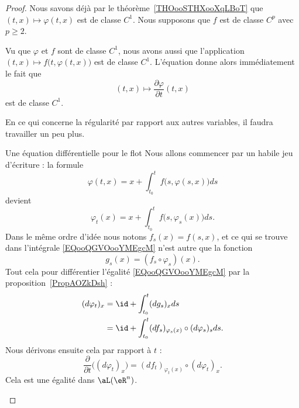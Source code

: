 \begin{proof}
    Nous savons déjà par le théorème~\ref{THOooSTHXooXqLBoT} que \( (t,x)\mapsto \varphi(t,x)\) est de classe \( C^1\). Nous supposons que \( f\) est de classe \( C^p\) avec \( p\geq 2\).

    Vu que \( \varphi\) et \( f\) sont de classe \( C^1\), nous avons aussi que l'application \( (t,x)\mapsto f\big( t,\varphi(t,x) \big)\) est de classe \( C^1\). L'équation donne alors immédiatement le fait que
    \begin{equation}
        (t,x)\mapsto\frac{ \partial \varphi }{ \partial t }(t,x)
    \end{equation}
    est de classe \( C^1\).

    En ce qui concerne la régularité par rapport aux autres variables, il faudra travailler un peu plus.

    \begin{subproof}
    \item[Une équation différentielle pour le flot]
    Nous allons commencer par un habile jeu d'écriture : la formule
    \begin{equation}
        \varphi(t,x)=x+\int_{t_0}^tf\big( s,\varphi(s,x) \big)ds
    \end{equation}
    devient
    \begin{equation}        \label{EQooQGVOooYMEgcM}
        \varphi_t(x)=x+\int_{t_0}^tf\big( s,\varphi_s(x) \big)ds.
    \end{equation}
    Dans le même ordre d'idée nous notons \( f_s(x)=f(s,x)\), et ce qui se trouve dans l'intégrale \eqref{EQooQGVOooYMEgcM} n'est autre que la fonction
    \begin{equation}
        g_s(x)=(f_s\circ\varphi_s)(x).
    \end{equation}
    Tout cela pour différentier l'égalité \eqref{EQooQGVOooYMEgcM} par la proposition~\ref{PropAOZkDsh} :
    \begin{subequations}
        \begin{align}
            (d\varphi_t)_x&=\id+\int_{t_0}^t(dg_s)_xds\\
            &=\id+\int_{t_0}^t(df_s)_{\varphi_s(x)}\circ(d\varphi_s)_sds.
        \end{align}
    \end{subequations}
    Nous dérivons ensuite cela par rapport à \( t\) :
    \begin{equation}        \label{EQooBETGooXKWRxX}
        \frac{ \partial  }{ \partial t }\Big( (d\varphi_t)_x \Big)=(df_t)_{\varphi_t(x)}\circ(d\varphi_t)_x.
    \end{equation}
    Cela est une égalité dans \( \aL(\eR^n)\).


\end{subproof}
\end{proof}
